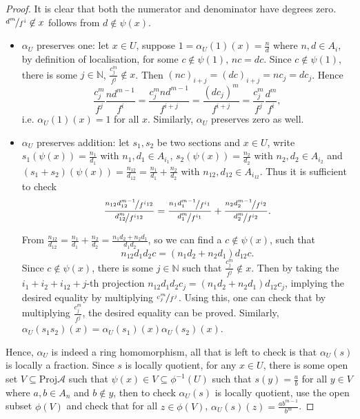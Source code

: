 \documentclass[a4paper,UKenglish,cleveref, autoref, thm-restate]{lipics-v2021}
\begin{document}
\begin{proof}
    It is clear that both the numerator and denominator have degrees zero. $\nicefrac{d^m}{f^i}\not\in x$ follows from $d\not\in\psi(x)$. 
    \begin{itemize}
        \item $\alpha_U$ preserves one: let $x\in U$, suppose $1=\alpha_U(1)(x)=\frac n d$ where $n,d\in A_i$, by definition of localisation, for some $c\not\in \psi(1)$, $nc=dc$. Since $c\not\in \psi(1)$, there is some $j\in\mathbb N$, $\frac{c_j^m}{f^j}\not\in x$. Then $(nc)_{i+j}=(dc)_{i+j}=nc_j=dc_j$. Hence
        $$
        \frac{c_j^m}{f^j}\frac{nd^{m-1}}{f^i}=\frac{c_j^mnd^{m-1}}{f^{i+j}}=\frac{(dc_j)^m}{f^{i+j}}=\frac{c_j^m}{f^j}\frac{d^m}{f^i},
        $$
        i.e. $\alpha_U(1)(x)=1$ for all $x$. Similarly, $\alpha_U$ preserves zero as well.
        \item $\alpha_U$ preserves addition: let $s_1, s_2$ be two sections and $x\in U$, write $s_1(\psi(x))=\frac{n_1}{d_1}$ with $n_1,d_1\in A_{i_1}$, $s_2(\psi(x))=\frac{n_2}{d_2}$ with $n_2, d_2\in A_{i_2}$ and $(s_1+s_2)(\psi(x))=\frac{n_{12}}{d_{12}}=\frac{n_1}{d_1}+\frac{n_2}{d_2}$ with $n_{12}, d_{12}\in A_{i_{12}}$. Thus it is sufficient to check
        $$
        \frac{\nicefrac{n_{12}d_{12}^{m-1}}{f^{i_{12}}}}{\nicefrac{d_{12}^m}{f^{i_{12}}}}=\frac{\nicefrac{n_1d_1^{m-1}}{f^{i_1}}}{\nicefrac{d_1^m}{f^{i_1}}} + \frac{\nicefrac{n_2d_2^{m-1}}{f^{i_2}}}{\nicefrac{d_2^m}{f^{i_2}}}.
        $$
        
        From $\frac{n_{12}}{d_{12}}=\frac{n_1}{d_1}+\frac{n_2}{d_2}=\frac{n_1d_2+n_2d_1}{d_1d_2}$, so we can find a $c\not\in \psi(x)$, such that 
        $$
        n_{12}d_1d_2c=(n_1d_2+n_2d_1)d_{12}c.
        $$
        Since $c\not\in \psi(x)$, there is some $j\in\mathbb N$ such that $\frac{c_j^m}{f^j}\not\in x$. Then by taking the $i_1+i_2+i_{12}+j$-th projection $n_{12}d_1d_2c_j=(n_1d_2+n_2d_1)d_{12}c_j$, implying the desired equality by multiplying $\nicefrac{c_j^m}{f^j}$. Using this, one can check that by multiplying $\frac{c_j^m}{f^j}$, the desired equality can be proved. Similarly, $\alpha_U(s_1s_2)(x)=\alpha_U(s_1)(x)\alpha_U(s_2)(x)$.
    \end{itemize}
    Hence, $\alpha_U$ is indeed a ring homomorphism, all that is left to check is that $\alpha_U(s)$ is locally a fraction. Since $s$ is locally quotient, for any $x\in U$, there is some open set $V\subseteq \mathrm{Proj}\mathcal{A}$ such that $\psi(x)\in V\subseteq \phi^{-1}(U)$ such that $s(y)=\frac a b$ for all $y\in V$ where $a,b\in A_n$ and $b\not\in y$, then to check $\alpha_U(s)$ is locally quotient, use the open subset $\phi(V)$ and check that for all $z\in \phi(V)$, $\alpha_U(s)(z)=\frac{ab^{m-1}}{b^m}$.
\end{proof}
\end{document}
